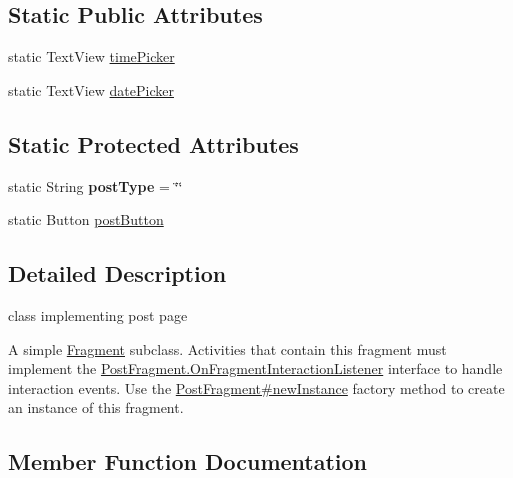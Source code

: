 \subsection*{Static Public Attributes}
\begin{DoxyCompactItemize}
\item 
static Text\+View \hyperlink{classcom_1_1example_1_1sel_1_1lostfound_1_1PostFragment_ac6d98a5b689bea76cf1248a20a54d23c}{time\+Picker}
\item 
static Text\+View \hyperlink{classcom_1_1example_1_1sel_1_1lostfound_1_1PostFragment_a1c187b07da5262cf568439018a826ef9}{date\+Picker}
\end{DoxyCompactItemize}
\subsection*{Static Protected Attributes}
\begin{DoxyCompactItemize}
\item 
static String {\bfseries post\+Type} = \char`\"{}\char`\"{}\hypertarget{classcom_1_1example_1_1sel_1_1lostfound_1_1PostFragment_acb0672afa2382233136ee251bef7149b}{}\label{classcom_1_1example_1_1sel_1_1lostfound_1_1PostFragment_acb0672afa2382233136ee251bef7149b}

\item 
static Button \hyperlink{classcom_1_1example_1_1sel_1_1lostfound_1_1PostFragment_ab2d93225b515c22ccd209e1382e1a4a1}{post\+Button}
\end{DoxyCompactItemize}


\subsection{Detailed Description}
class implementing post page 

A simple \hyperlink{}{Fragment} subclass. Activities that contain this fragment must implement the \hyperlink{interfacecom_1_1example_1_1sel_1_1lostfound_1_1PostFragment_1_1OnFragmentInteractionListener}{Post\+Fragment.\+On\+Fragment\+Interaction\+Listener} interface to handle interaction events. Use the \hyperlink{classcom_1_1example_1_1sel_1_1lostfound_1_1PostFragment_a7350f5b81aa9144d9acdeca902676773}{Post\+Fragment\#new\+Instance} factory method to create an instance of this fragment. 

\subsection{Member Function Documentation}
